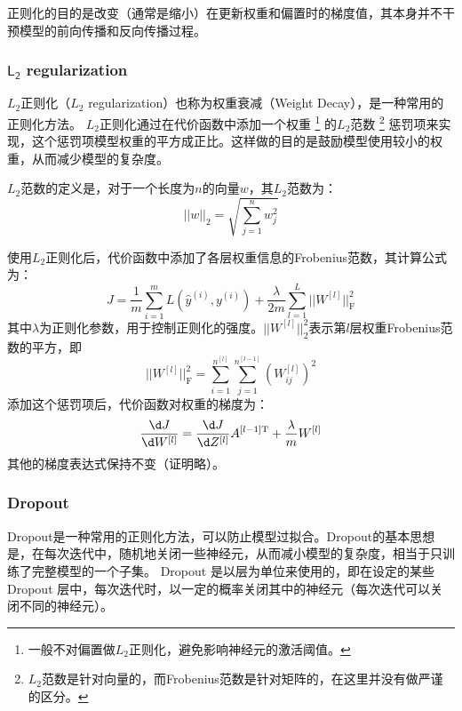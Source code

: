 \begin{hint}
    正则化的目的是改变（通常是缩小）在更新权重和偏置时的梯度值，其本身并不干预模型的前向传播和反向传播过程。
\end{hint}

\subsubsection{$\mathsf{L_2}$ regularization}

$L_2$正则化（$L_2$ regularization）也称为权重衰减（Weight Decay），是一种常用的正则化方法。
$L_2$正则化通过在代价函数中添加一个权重
\footnote{一般不对偏置做$L_2$正则化，避免影响神经元的激活阈值。}
的$L_2$范数
\footnote{$L_2$范数是针对向量的，而Frobenius范数是针对矩阵的，在这里并没有做严谨的区分。}
惩罚项来实现，这个惩罚项模型权重的平方成正比。这样做的目的是鼓励模型使用较小的权重，从而减少模型的复杂度。

$L_2$范数的定义是，对于一个长度为$n$的向量$w$，其$L_2$范数为：
\begin{equation}
    ||w||_2 = \sqrt{\sum_{j=1}^nw_j^2}
\end{equation}

使用$L_2$正则化后，代价函数中添加了各层权重信息的Frobenius范数，其计算公式为：
\begin{equation}
    J = \frac{1}{m}\sum_{i=1}^mL(\hat{y}^{(i)}, y^{(i)}) + \frac{\lambda}{2m}\sum_{l=1}^L||W^{[l]}||_{\mathrm{F}}^2
\end{equation}
其中$\lambda$为正则化参数，用于控制正则化的强度。$||W^{[l]}||_2^2$表示第$l$层权重Frobenius范数的平方，即
\begin{equation}
    ||W^{[l]}||_{\mathrm{F}}^2 = \sum_{i=1}^{n^{[l]}}\sum_{j=1}^{n^{[l-1]}}(W_{ij}^{[l]})^2
\end{equation}
添加这个惩罚项后，代价函数对权重的梯度为：
\begin{equation}
    \frac{\d J}{\d W^{[l]}} = \frac{\d J}{\d Z^{[l]}} A^{[l-1] \mathrm{T}} + \frac{\lambda}{m}W^{[l]}
\end{equation}
其他的梯度表达式保持不变（证明略）。

\subsubsection{Dropout}

Dropout是一种常用的正则化方法，可以防止模型过拟合。Dropout的基本思想是，在每次迭代中，随机地关闭一些神经元，从而减小模型的复杂度，相当于只训练了完整模型的一个子集。
Dropout 是以层为单位来使用的，即在设定的某些 Dropout 层中，每次迭代时，以一定的概率关闭其中的神经元（每次迭代可以关闭不同的神经元）。

